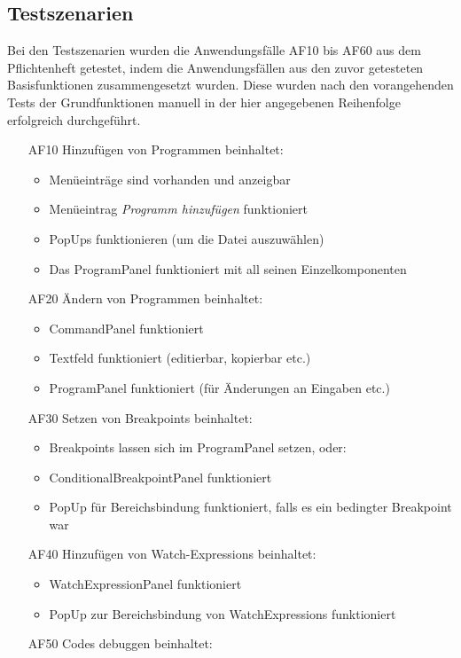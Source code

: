 \documentclass[parskip=full]{scrartcl}
\begin{document}
\subsection{Testszenarien}
Bei den Testszenarien wurden die Anwendungsfälle AF10 bis AF60 aus dem Pflichtenheft getestet, indem die Anwendungsfällen aus den zuvor getesteten Basisfunktionen zusammengesetzt wurden. Diese wurden nach den vorangehenden Tests der Grundfunktionen manuell in der hier angegebenen Reihenfolge erfolgreich durchgeführt.
\begin{itemize} 
	\item[AF10] Hinzufügen von Programmen beinhaltet: 
	\begin{itemize}
		\item Menüeinträge sind vorhanden und anzeigbar
		\item Menüeintrag \textit{Programm hinzufügen} funktioniert
		\item PopUps funktionieren (um die Datei auszuwählen)
		\item Das ProgramPanel funktioniert mit all seinen Einzelkomponenten
	\end{itemize}
	\item[AF20] Ändern von Programmen beinhaltet:
	\begin{itemize}
		\item CommandPanel funktioniert
		\item Textfeld funktioniert (editierbar, kopierbar etc.)
		\item ProgramPanel funktioniert (für Änderungen an Eingaben etc.)
	\end{itemize}
	\item[AF30] Setzen von Breakpoints beinhaltet:
	\begin{itemize}
		\item Breakpoints lassen sich im ProgramPanel setzen, oder:
		\item ConditionalBreakpointPanel funktioniert
		\item PopUp für Bereichsbindung funktioniert, falls es ein bedingter Breakpoint war
	\end{itemize}
	\item[AF40] Hinzufügen von Watch-Expressions beinhaltet:
	\begin{itemize}
		\item WatchExpressionPanel funktioniert
		\item PopUp zur Bereichsbindung von WatchExpressions funktioniert
	\end{itemize}
	\item[AF50] Codes debuggen beinhaltet:

\end{itemize}
\end{document}
